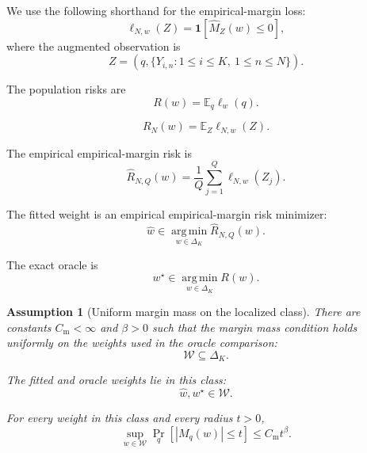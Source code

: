 \documentclass{article} %
\newtheorem{assumption}{Assumption}
\providecommand{\argmin}{\mathop{\mathrm{arg\,min}}\limits}
\providecommand{\simplex}{\Delta_K}
\providecommand{\Risk}{R}
\providecommand{\Mhat}{\widehat{M}}
\providecommand{\what}{\widehat{w}}
\providecommand{\wstar}{w^{\star}}
\begin{document}
We use the following shorthand for the empirical-margin loss:
\begin{equation}
\label{eq:app2-loss-noisy}
\ell_{N,w}(Z)
=
\mathbf 1\!\left[\Mhat_Z(w)\le 0\right],
\end{equation}
where the augmented observation is
\begin{equation}
\label{eq:app2-Z}
Z
=
\left(q,\{Y_{i,n}:1\le i\le K,\ 1\le n\le N\}\right).
\end{equation}

The population risks are
\begin{equation}
\label{eq:app2-risk-exact}
\Risk(w)
=
\mathbb E_q \ell_w(q).
\end{equation}

\begin{equation}
\label{eq:app2-risk-noisy}
\Risk_N(w)
=
\mathbb E_Z \ell_{N,w}(Z).
\end{equation}

The empirical empirical-margin risk is
\begin{equation}
\label{eq:app2-risk-train}
\widehat{\Risk}_{N,Q}(w)
=
\frac1Q\sum_{j=1}^{Q}\ell_{N,w}(Z_j).
\end{equation}

The fitted weight is an empirical empirical-margin risk minimizer:
\begin{equation}
\label{eq:app2-erm}
\what
\in
\argmin_{w\in\simplex}\widehat{\Risk}_{N,Q}(w).
\end{equation}

The exact oracle is
\begin{equation}
\label{eq:app2-wstar}
\wstar
\in
\argmin_{w\in\simplex}\Risk(w).
\end{equation}

\begin{assumption}[Uniform margin mass on the localized class]
\label{ass:A4}
There are constants \(C_{\mathrm m}<\infty\) and \(\beta>0\) such that the margin
mass condition holds uniformly on the weights used in the oracle comparison:
\begin{equation}
\label{eq:app2-A4-class}
\mathcal W
\subseteq
\simplex .
\end{equation}

The fitted and oracle weights lie in this class:
\begin{equation}
\label{eq:app2-A4-membership}
\what,\wstar\in\mathcal W .
\end{equation}

For every weight in this class and every radius \(t>0\),
\begin{equation}
\label{eq:app2-A4-margin}
\sup_{w\in\mathcal W}
\Pr_q\!\left[
|M_q(w)|\le t
\right]
\le
C_{\mathrm m} t^\beta .
\end{equation}
\end{assumption}
\end{document}
